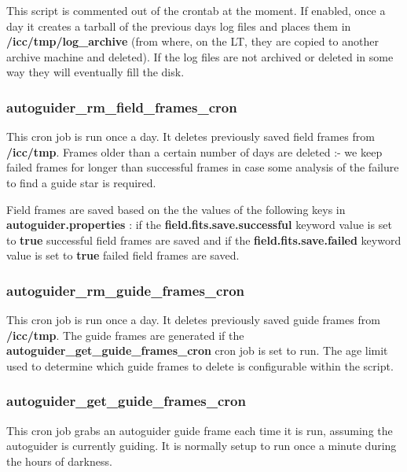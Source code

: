 \documentclass[10pt,a4paper]{article}
\begin{document}
This script is commented out of the crontab at the moment. If enabled, once a day it creates a tarball of the previous days log files and places them in {\bf /icc/tmp/log\_archive} (from where, on the LT, they are copied to another archive machine and deleted). If the log files are not archived or deleted in some way they will eventually fill the disk.

\subsubsection{autoguider\_rm\_field\_frames\_cron}

This cron job is run once a day. It deletes previously saved field frames from {\bf /icc/tmp}. Frames older than a certain number of days are deleted :- we keep failed frames for longer than successful frames in case some analysis of the failure to find a guide star is required. 

Field frames are saved based on the the values of the following keys in {\bf autoguider.properties} : 
if the {\bf field.fits.save.successful} keyword value is set to {\bf true} successful field frames are saved 
and if the {\bf field.fits.save.failed} keyword value is set to {\bf true} failed field frames are saved.

\subsubsection{autoguider\_rm\_guide\_frames\_cron}

This cron job is run once a day. It deletes previously saved guide frames from {\bf /icc/tmp}. The guide frames
are generated if the {\bf autoguider\_get\_guide\_frames\_cron} cron job is set to run. The age limit used to
determine which guide frames to delete is configurable within the script.

\subsubsection{autoguider\_get\_guide\_frames\_cron}

This cron job grabs an autoguider guide frame each time it is run, assuming the autoguider is currently guiding. It is normally setup to run once a minute during the hours of darkness.
\end{document}
